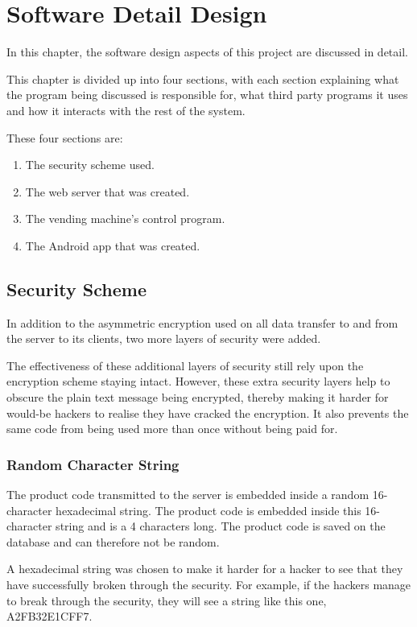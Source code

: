 \chapter{Software Detail Design}
\label{chap:4}

In this chapter, the software design aspects of this project are discussed in
detail.

This chapter is divided up into four sections, with each section explaining what
the program being discussed is responsible for, what third party programs it
uses and how it interacts with the rest of the system. 

These four sections are:

\begin{enumerate}
  \item The security scheme used.
  \item The web server that was created.
  \item The vending machine's control program.
  \item The Android app that was created.
\end{enumerate}

\section{Security Scheme}
\label{sec:security-code-scheme}

In addition to the asymmetric encryption used on all data transfer to and from
the server to its clients, two more layers of security were added. 

The effectiveness of these additional layers of security still rely upon the
encryption scheme staying intact. However, these extra security layers help to
obscure the plain text message being encrypted, thereby making it harder for
would-be hackers to realise they have cracked the encryption. It also prevents
the same code from being used more than once without being paid for. 

\subsection{Random Character String}

The product code transmitted to the server is embedded inside a
random 16-character hexadecimal string. The product code is embedded inside this
16-character string and is a 4 characters long. The product code is saved on the
database and can therefore not be random. 

A hexadecimal string was chosen to make it
harder for a hacker to see that they have successfully broken through the
security. For example, if the hackers manage to break through the security,
they will see a string like this one, A2FB32E1CFF7.


